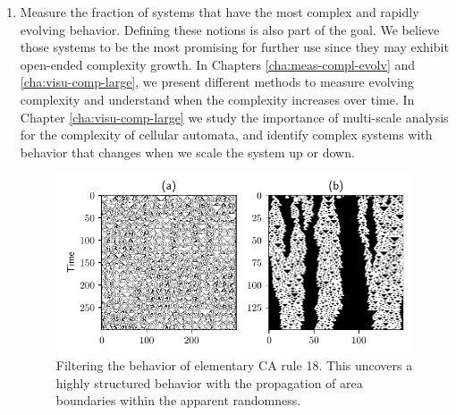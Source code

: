 \begin{enumerate}
  \item Measure the fraction of systems that have the most complex and rapidly
        evolving behavior. Defining these notions is also part of the goal. We
        believe those systems to be the most promising for further use since
        they may exhibit open-ended complexity growth. In Chapters
        \ref{cha:meas-compl-evolv} and \ref{cha:visu-comp-large}, we present
        different methods to measure evolving complexity and understand when the
        complexity increases over time. In Chapter \ref{cha:visu-comp-large} we
        study the importance of multi-scale analysis for the complexity of
        cellular automata, and identify complex systems with behavior that
        changes when we scale the system up or down.
\begin{figure}[htbp]
  \centering
 \includegraphics[width=.9\linewidth]{figures/rule18_small}
 \caption{Filtering the behavior of elementary \acl{CA} rule 18. This
   uncovers a highly structured behavior with the propagation of area boundaries
   within the apparent randomness.}
  \label{fig:rule_18}
\end{figure}


\end{enumerate}
